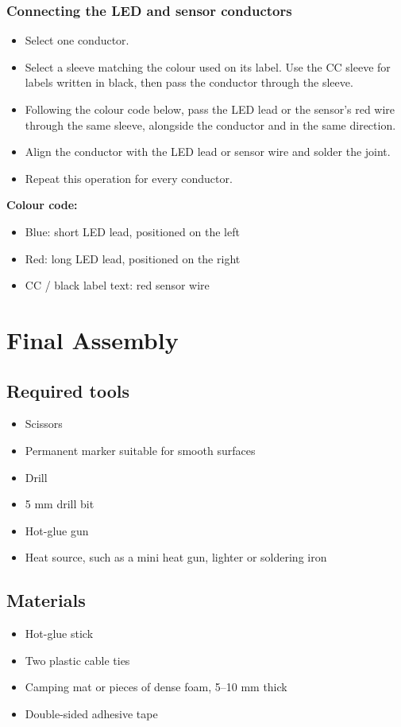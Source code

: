 \documentclass[11pt,a4paper]{article}
\newcommand{\tools}{\subsection{Required tools}}
\newcommand{\materials}{\subsection{Materials}}
\begin{document}
\subsubsection{Connecting the LED and sensor conductors}
\begin{itemize}
  \item Select one conductor.
  \item Select a sleeve matching the colour used on its label. Use the CC sleeve for labels written in black, then pass the conductor through the sleeve.
  \item Following the colour code below, pass the LED lead or the sensor's red wire through the same sleeve, alongside the conductor and in the same direction.
  \item Align the conductor with the LED lead or sensor wire and solder the joint.
  \item Repeat this operation for every conductor.
\end{itemize}

\textbf{Colour code:}
\begin{itemize}
  \item Blue: short LED lead, positioned on the left
  \item Red: long LED lead, positioned on the right
  \item CC / black label text: red sensor wire
\end{itemize}

\section{Final Assembly}

\tools
\begin{itemize}
  \item Scissors
  \item Permanent marker suitable for smooth surfaces
  \item Drill
  \item 5 mm drill bit
  \item Hot-glue gun
  \item Heat source, such as a mini heat gun, lighter or soldering iron
\end{itemize}

\materials
\begin{itemize}
  \item Hot-glue stick
  \item Two plastic cable ties
  \item Camping mat or pieces of dense foam, 5--10 mm thick
  \item Double-sided adhesive tape
\end{itemize}
\end{document}
